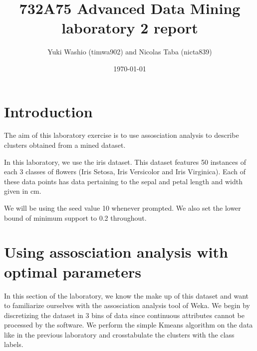 \documentclass[letterpaper,12pt]{article}
\begin{document}
\title{732A75 Advanced Data Mining laboratory 2 report}
\author{Yuki Washio (timwa902) and Nicolas Taba (nicta839)}
\date{\today}
\maketitle



\section{Introduction}

The aim of this laboratory exercise is to use assosciation analysis to describe clusters obtained from a mined dataset.

In this laboratory, we use the iris dataset. This dataset features 50 instances of each 3 classes of flowers (Iris Setosa, Iris Versicolor and Iris Virginica). Each of these data points has data pertaining to the sepal and petal length and width given in cm.

We will be using the seed value 10 whenever prompted. We also set the lower bound of minimum support to 0.2 throughout.


\section{Using assosciation analysis with optimal parameters}

In this section of the laboratory, we know the make up of this dataset and want to familiarize ourselves with the assosciation analysis tool of Weka. We begin by discretizing the dataset in 3 bins of data since continuous attributes cannot be processed by the software. We perform the simple Kmeans algorithm on the data like in the previous laboratory and crosstabulate the clusters with the class labels.
\end{document}
